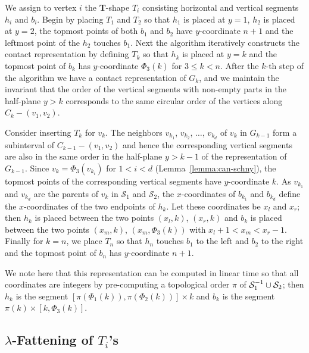 \documentclass[11pt]{article}
\begin{document}
We assign to vertex $i$ the \textbf{T}-shape $T_i$
consisting horizontal and vertical segments $h_i$ and $b_i$.
Begin by placing $T_1$ and $T_2$ so that $h_1$ is placed at $y=1$, $h_2$ is placed at $y=2$, the
 topmost points of both $b_1$ and $b_2$ have $y$-coordinate $n+1$ and the leftmost point of the $h_2$ touches $b_1$.
 Next the algorithm iteratively constructs the contact representation
 by defining $T_k$ so that $h_k$ is placed at $y=k$ and the topmost point of $b_k$ has
 $y$-coordinate $\Phi_3(k)$ for $3\le k<n$.  After the $k$-th step of
 the algorithm we have a contact representation of $G_k$, and we
 maintain the invariant that the order of the
 vertical segments with non-empty parts in the half-plane $y>k$ corresponds to the same circular order of the
 vertices along $C_k-(v_1, v_2)$.

Consider inserting $T_k$ for $v_k$. The neighbors $v_{k_1}$, $v_{k_2}$, $\ldots$, $v_{k_d}$
 of $v_k$ in $G_{k-1}$ form a subinterval of $C_{k-1}-(v_1, v_2)$ and hence the corresponding vertical segments are
 also in the same order in the half-plane $y>k-1$ of the representation of $G_{k-1}$. Since $v_k=\Phi_3(v_{k_i})$ for $1<i<d$ (Lemma~\ref{lemma:can-schny}),
the topmost points of the
 corresponding vertical segments have $y$-coordinate $k$. As $v_{k_1}$ and  $v_{k_d}$ are the parents of $v_k$ in
 $\mathcal{S}_1$ and $\mathcal{S}_2$, the
 $x$-coordinates of $b_{k_1}$ and $b_{k_d}$ define the $x$-coordinates
 of the two endpoints of $h_k$. Let
these coordinates be
 $x_l$ and $x_r$; then $h_k$ is placed between the two points $(x_l, k)$, $(x_r, k)$ and $b_k$ is placed between
 the two points $(x_m, k)$, $(x_m, \Phi_3(k))$ with $x_l+1<x_m<x_r-1$. Finally for $k=n$, we place $T_n$ so
 that $h_n$ touches $b_1$ to the left and $b_2$ to the right and the topmost point of $b_n$ has $y$-coordinate $n+1$.


We note here that this representation can be computed in linear time so that all coordinates are integers by pre-computing a topological order
$\pi$ of ${\cal S}_1^{-1}\cup {\cal S}_2$; then  $h_k$ is the
segment $[\pi(\Phi_1(k)),\pi(\Phi_2(k))]\times k$ and $b_k$ is the
segment $\pi(k)\times [k,\Phi_3(k)]$.


\subsection{$\lambda$-Fattening of $T_i$'s}
\end{document}
